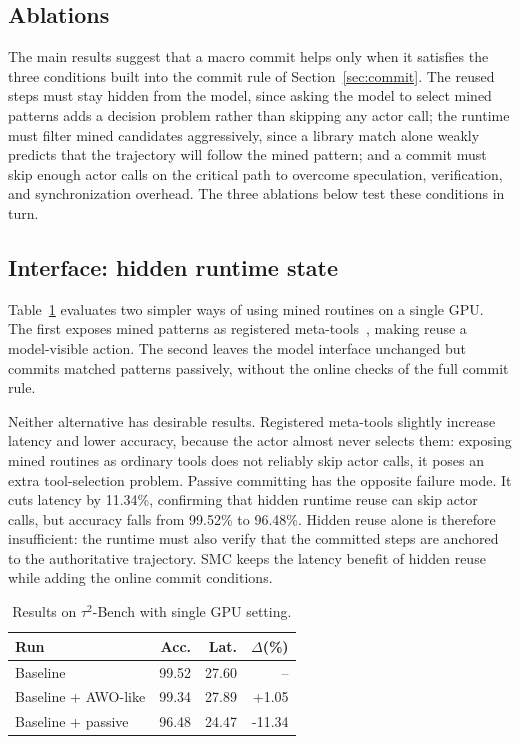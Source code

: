 \subsection{Ablations}
The main results suggest that a macro commit helps only when it satisfies the three conditions built into the commit rule of Section~\ref{sec:commit}. 
The reused steps must stay hidden from the model, since asking the model to select mined patterns adds a decision problem rather than skipping any actor call; the runtime must filter mined candidates aggressively, since a library match alone weakly predicts that the trajectory will follow the mined pattern; and a commit must skip enough actor calls on the critical path to overcome speculation, verification, and synchronization overhead. 
The three ablations below test these conditions in turn.

\subsection{Interface: hidden runtime state}
 
Table~\ref{tab:single-gpu-alternatives} evaluates two simpler ways of using mined routines on a single GPU. 
The first exposes mined patterns as registered meta-tools~\citep{awo-metatools-2026}, making reuse a model-visible action. 
The second leaves the model interface unchanged but commits matched patterns passively, without the online checks of the full commit rule.

Neither alternative has desirable results. 
Registered meta-tools slightly increase latency and lower accuracy, because the actor almost never selects them: exposing mined routines as ordinary tools does not reliably skip actor calls, it poses an extra tool-selection problem. 
Passive committing has the opposite failure mode. It cuts latency by 11.34\%, confirming that hidden runtime reuse can skip actor calls, but accuracy falls from 99.52\% to 96.48\%. 
Hidden reuse alone is therefore insufficient: the runtime must also verify that the committed steps are anchored to the authoritative trajectory. SMC keeps the latency benefit of hidden reuse while adding the online commit conditions.

\begin{table}[t]
\centering
\small
\caption{Results on $\tau^2$-Bench with single GPU setting. }
\label{tab:single-gpu-alternatives}
\begin{tabular}{lrrr}
\toprule
Run & Acc. & Lat. & $\Delta$(\%) \\
\midrule
Baseline & 99.52 & 27.60 & -- \\
Baseline + AWO-like & 99.34 & 27.89 & +1.05 \\
Baseline + passive & 96.48 & 24.47 & -11.34 \\
\bottomrule
\end{tabular}
\end{table}

